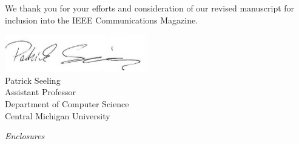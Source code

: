 \documentclass[11pt]{article}
\begin{document}
We thank you for your efforts and consideration of our revised manuscript for inclusion into the IEEE Communications Magazine.

\vspace{2em}
\includegraphics[scale=0.75]{signature}\\
{
Patrick Seeling\\
Assistant Professor\\
Department of Computer Science\\
Central Michigan University}
  
\vspace{2em}
{\slshape Enclosures}
\end{document}
